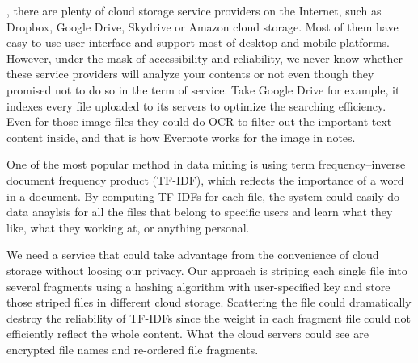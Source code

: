 
, there are plenty of cloud storage service providers on the Internet, such as Dropbox, Google Drive, Skydrive or Amazon cloud storage. Most of them have easy-to-use user interface and support most of desktop and mobile platforms. However, under the mask of accessibility and reliability, we never know whether these service providers will analyze your contents or not even though they promised not to do so in the term of service. Take Google Drive for example, it indexes every file uploaded to its servers to optimize the searching efficiency. Even for those image files they could do OCR to filter out the important text content inside, and that is how Evernote works for the image in notes.

One of the most popular method in data mining is using term frequency–inverse document frequency product (TF-IDF)\cite{TF-IDF}, which reflects the importance of a word in a document. By computing TF-IDFs for each file, the system could easily do data anaylsis for all the files that belong to specific users and learn what they like, what they working at, or anything personal. 

We need a service that could take advantage from the convenience of cloud storage without loosing our privacy. Our approach is striping each single file into several fragments using a hashing algorithm with user-specified key and store those striped files in different cloud storage. Scattering the file could dramatically destroy the reliability of TF-IDFs since the weight in each fragment file could not efficiently reflect the whole content. What the cloud servers could see are encrypted file names and re-ordered file fragments.
